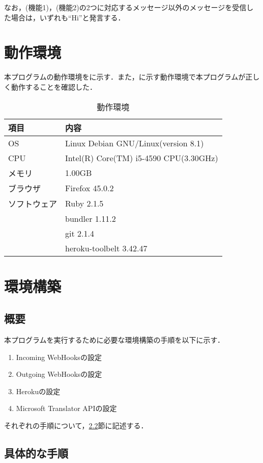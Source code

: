 \documentclass[fleqn, 14pt]{sty/extarticlej}
\begin{document}
なお，(機能1)，(機能2)の2つに対応するメッセージ以外のメッセージを受信した場合は，いずれも``Hi''と発言する．

\section{動作環境}
本プログラムの動作環境をに示す．また，に示す動作環境で本プログラムが正しく動作することを確認した．
\begin{table}
  \begin{center}
    \caption{動作環境}\label{tab:動作環境}
    \begin{tabular}{l|l}
      \hline\hline
      項目 & 内容\\
      \hline
      OS & Linux Debian GNU/Linux(version 8.1)\\
      CPU & Intel(R) Core(TM) i5-4590 CPU(3.30GHz)\\
      メモリ & 1.00GB\\
      ブラウザ & Firefox 45.0.2\\
      ソフトウェア & Ruby 2.1.5\\
      & bundler 1.11.2\\
      & git 2.1.4\\
      & heroku-toolbelt 3.42.47\\
      \hline
    \end{tabular}
  \end{center}
\end{table}


\section{環境構築}
\subsection{概要}
本プログラムを実行するために必要な環境構築の手順を以下に示す．
\begin{enumerate}
\item Incoming WebHooksの設定
\item Outgoing WebHooksの設定
\item Herokuの設定
\item Microsoft Translator APIの設定
\end{enumerate}
それぞれの手順について，\ref{sec:具体的な手順}節に記述する．

\subsection{具体的な手順}
\label{sec:具体的な手順}
\end{document}
